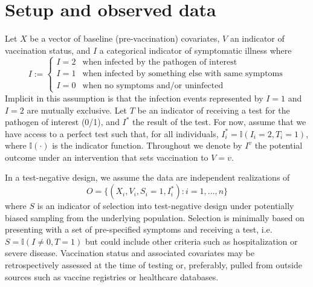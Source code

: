 \documentclass[11pt]{article}
\begin{document}
\section{Setup and observed data} \label{sec:setup}
Let $X$ be a vector of baseline (pre-vaccination) covariates, $V$ an indicator of vaccination status, and $I$ a categorical indicator of symptomatic illness where
        $$I := \begin{cases} 
        I = 2 & \text{when infected by the pathogen of interest} \\
        I = 1 & \text{when infected by something else with same symptoms} \\
        I = 0 & \text{when no symptoms and/or uninfected}
        \end{cases}$$
Implicit in this assumption is that the infection events represented by $I = 1$ and $I = 2$ are mutually exclusive. Let $T$ be an indicator of receiving a test for the pathogen of interest (0/1), and $I^*$ the result of the test. For now, assume that we have access to a perfect test such that, for all individuals, $I^*_i = \mathbb{I}(I_i = 2, T_i = 1)$, where $\mathbb{I}(\cdot)$ is the indicator function. Throughout we denote by $I^v$ the potential outcome under an intervention that sets vaccination to $V=v$. 
    
In a test-negative design, we assume the data are independent realizations of 
$$O = \{(X_i, V_i, S_i = 1, I^*_i) : i = 1, \ldots, n\}$$
where $S$ is an indicator of selection into test-negative design under potentially biased sampling from the underlying population. Selection is minimally based on presenting with a set of pre-specified symptoms and receiving a test, i.e. $S = \mathbb{I}(I \neq 0, T = 1)$ but could include other criteria such as hospitalization or severe disease. Vaccination status and associated covariates may be retrospectively assessed at the time of testing or, preferably, pulled from outside sources such as vaccine registries or healthcare databases. 
\end{document}
